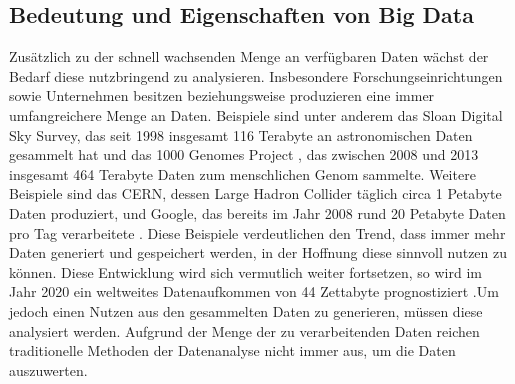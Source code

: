 
\subsection{Bedeutung und Eigenschaften von Big Data}
\label{sec:BigData}
Zusätzlich zu der schnell wachsenden Menge an verfügbaren Daten wächst der Bedarf diese nutzbringend zu analysieren. Insbesondere Forschungseinrichtungen sowie Unternehmen besitzen beziehungsweise produzieren eine immer umfangreichere Menge an Daten. Beispiele sind unter anderem das Sloan Digital Sky Survey, das seit 1998 insgesamt 116 Terabyte an astronomischen Daten gesammelt hat \cite{York2000, Alam2015} und das 1000 Genomes Project \cite{Baker2010}, das zwischen 2008 und 2013 insgesamt 464 Terabyte Daten zum menschlichen Genom sammelte. Weitere Beispiele sind das CERN, dessen Large Hadron Collider täglich circa 1 Petabyte Daten produziert, und Google, das bereits im Jahr 2008 rund 20 Petabyte Daten pro Tag verarbeitete \cite{Dean2008}. Diese Beispiele verdeutlichen den Trend, dass immer mehr Daten generiert und gespeichert werden, in der Hoffnung diese sinnvoll nutzen zu können. Diese Entwicklung wird sich vermutlich weiter fortsetzen, so wird im Jahr 2020 ein weltweites Datenaufkommen von 44 Zettabyte prognostiziert \cite{EMC2014}.Um jedoch einen Nutzen aus den gesammelten Daten zu generieren, müssen diese analysiert werden. Aufgrund der Menge der zu verarbeitenden Daten reichen traditionelle Methoden der Datenanalyse nicht immer aus, um die Daten auszuwerten.

